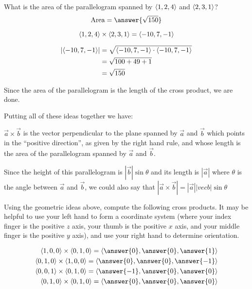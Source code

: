 \documentclass{ximera}
\begin{document}
\begin{question}
  What is the area of the parallelogram spanned by $\left\langle 1,2,4\right\rangle$ and $\left\langle 2,3,1\right\rangle$?
  \[
  \textrm{Area} = \answer{\sqrt{150}}
  \]
  
  \begin{hint}
    \[
    \left\langle 1,2,4\right\rangle \times \left\langle 2,3,1\right\rangle = \left\langle -10,7,-1\right\rangle
    \]
  \end{hint}
  
  
  \begin{hint}
    \begin{align*}
      \left| \left\langle -10,7,-1\right\rangle \right| &= \sqrt{ \left\langle -10,7,-1\right\rangle \cdot  \left\langle -10,7,-1\right\rangle}\\
      &=\sqrt{100+49+1}\\
      &=\sqrt{150}
    \end{align*}
    
    Since the area of the parallelogram is the length of the cross product, we are done.
  \end{hint}
\end{question}

Putting all of these ideas together we have:

\begin{theorem}
  $\vec{a} \times \vec{b}$ is the vector perpendicular to the plane
  spanned by $\vec{a}$ and $\vec{b}$ which points in the ``positive
  direction'', as given by the right hand rule, and whose length is
  the area of the parallelogram spanned by $\vec{a}$ and $\vec{b}$.
\end{theorem}

\begin{observation}
  Since the height of this parallelogram is $|\vec{b}| \sin\theta$ and
  its length is $|\vec{a}|$ where $\theta$ is the angle between
  $\vec{a}$ and $\vec{b}$, we could also say that $|\vec{a} \times
  \vec{b}| = |\vec{a}||vec{b}| \sin\theta$
\end{observation}

\begin{question}
  Using the geometric ideas above, compute the following cross
  products.  It may be helpful to use your left hand to form a
  coordinate system (where your index finger is the positive $z$ axis,
  your thumb is the positive $x$ axis, and your middle finger is the
  positive $y$ axis), and use your right hand to determine
  orientation.
  
  \begin{align*}
    \vector{1,0,0} \times \vector{0,1,0} = \vector{\answer{0},\answer{0},\answer{1}}\\
    \vector{0,1,0} \times \vector{1,0,0} = \vector{\answer{0},\answer{0},\answer{-1}}\\
    \vector{0,0,1} \times \vector{0,1,0} = \vector{\answer{-1},\answer{0},\answer{0}}\\
    \vector{0,1,0} \times \vector{0,1,0} = \vector{\answer{0},\answer{0},\answer{0}}\\
  \end{align*}
\end{question}
\end{document}
